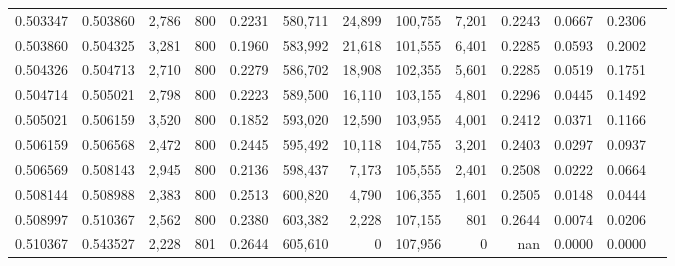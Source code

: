 \begin{tabular}{rrrrrrrrrrrrr}
0.503347 & 0.503860 & 2,786 & 800 &                                     0.2231 & 580,711 &  24,899 & 100,755 &   7,201 & 0.2243 & 0.0667 & 0.2306 \\
0.503860 & 0.504325 & 3,281 & 800 &                                     0.1960 & 583,992 &  21,618 & 101,555 &   6,401 & 0.2285 & 0.0593 & 0.2002 \\
0.504326 & 0.504713 & 2,710 & 800 &                                     0.2279 & 586,702 &  18,908 & 102,355 &   5,601 & 0.2285 & 0.0519 & 0.1751 \\
0.504714 & 0.505021 & 2,798 & 800 &                                     0.2223 & 589,500 &  16,110 & 103,155 &   4,801 & 0.2296 & 0.0445 & 0.1492 \\
0.505021 & 0.506159 & 3,520 & 800 &                                     0.1852 & 593,020 &  12,590 & 103,955 &   4,001 & 0.2412 & 0.0371 & 0.1166 \\
0.506159 & 0.506568 & 2,472 & 800 &                                     0.2445 & 595,492 &  10,118 & 104,755 &   3,201 & 0.2403 & 0.0297 & 0.0937 \\
0.506569 & 0.508143 & 2,945 & 800 &                                     0.2136 & 598,437 &   7,173 & 105,555 &   2,401 & 0.2508 & 0.0222 & 0.0664 \\
0.508144 & 0.508988 & 2,383 & 800 &                                     0.2513 & 600,820 &   4,790 & 106,355 &   1,601 & 0.2505 & 0.0148 & 0.0444 \\
0.508997 & 0.510367 & 2,562 & 800 &                                     0.2380 & 603,382 &   2,228 & 107,155 &     801 & 0.2644 & 0.0074 & 0.0206 \\
0.510367 & 0.543527 & 2,228 & 801 &                                     0.2644 & 605,610 &       0 & 107,956 &       0 &    nan & 0.0000 & 0.0000 \\
\bottomrule
\end{tabular}

